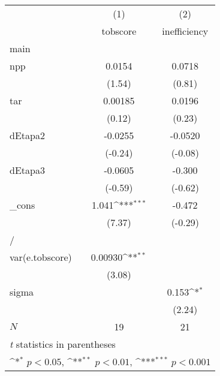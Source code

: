 {
\def\sym#1{\ifmmode^{#1}\else\(^{#1}\)\fi}
\begin{tabular}{l*{2}{c}}
\hline\hline
            &\multicolumn{1}{c}{(1)}&\multicolumn{1}{c}{(2)}\\
            &\multicolumn{1}{c}{tobscore}&\multicolumn{1}{c}{inefficiency}\\
\hline
main        &                     &                     \\
npp         &      0.0154         &      0.0718         \\
            &      (1.54)         &      (0.81)         \\
[1em]
tar         &     0.00185         &      0.0196         \\
            &      (0.12)         &      (0.23)         \\
[1em]
dEtapa2     &     -0.0255         &     -0.0520         \\
            &     (-0.24)         &     (-0.08)         \\
[1em]
dEtapa3     &     -0.0605         &      -0.300         \\
            &     (-0.59)         &     (-0.62)         \\
[1em]
\_cons      &       1.041\sym{***}&      -0.472         \\
            &      (7.37)         &     (-0.29)         \\
\hline
/           &                     &                     \\
var(e.tobscore)&     0.00930\sym{**} &                     \\
            &      (3.08)         &                     \\
[1em]
sigma       &                     &       0.153\sym{*}  \\
            &                     &      (2.24)         \\
\hline
\(N\)       &          19         &          21         \\
\hline\hline
\multicolumn{3}{l}{\footnotesize \textit{t} statistics in parentheses}\\
\multicolumn{3}{l}{\footnotesize \sym{*} \(p<0.05\), \sym{**} \(p<0.01\), \sym{***} \(p<0.001\)}\\
\end{tabular}
}
